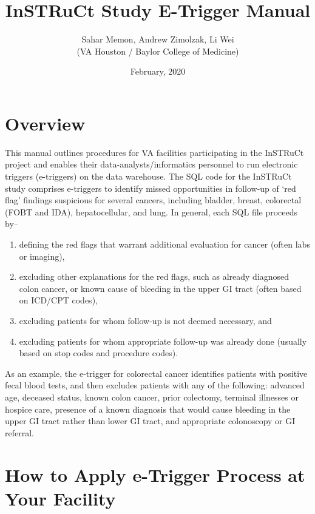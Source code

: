 \documentclass{article}
\author{Sahar Memon, Andrew Zimolzak, Li Wei\\(VA Houston / Baylor
  College of Medicine)}
\title{InSTRuCt Study E-Trigger Manual}
\date{February, 2020}
\begin{document}
\maketitle

\section{Overview}

This manual outlines procedures for VA facilities participating in the
InSTRuCt project and enables their data-analysts/informatics personnel
to run electronic triggers (e-triggers) on the data warehouse. The SQL
code for the InSTRuCt study comprises e-triggers to identify missed
opportunities in follow-up of `red flag' findings suspicious for
several cancers, including bladder, breast, colorectal (FOBT and IDA),
hepatocellular, and lung. In general, each SQL file proceeds by--

\begin{enumerate}
\item defining the red flags that warrant additional evaluation for
  cancer (often labs or imaging),

\item excluding other explanations for the red flags, such as already
  diagnosed colon cancer, or known cause of bleeding in the upper GI
  tract (often based on ICD/CPT codes),

\item excluding patients for whom follow-up is not deemed necessary,
  and

\item excluding patients for whom appropriate follow-up was already
  done (usually based on stop codes and procedure codes).
\end{enumerate}

As an example, the e-trigger for colorectal cancer identifies patients
with positive fecal blood tests, and then excludes patients with any
of the following: advanced age, deceased status, known colon cancer,
prior colectomy, terminal illnesses or hospice care, presence of a
known diagnosis that would cause bleeding in the upper GI tract rather
than lower GI tract, and appropriate colonoscopy or GI referral.

\section{How to Apply e-Trigger Process at Your Facility}
\end{document}
